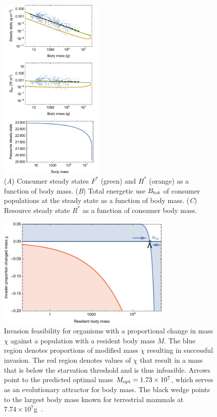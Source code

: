 \documentclass{pnastwo}
\begin{document}
\begin{figure}
\centering
\includegraphics[width=0.45\textwidth]{fig_FPAllometric.pdf}
\caption{ (\emph{A}) Consumer steady states $F^*$ (green) and $H^*$ (orange) as a function of
  body mass.
  (\emph{B}) Total energetic use $B_{\rm tot}$ of consumer populations at the steady state as a function of body mass.
  (\emph{C}) Resource steady state $R^*$ as a function of consumer body mass.}
\label{fig:mass}
\end{figure}

\begin{figure}
\centering
\includegraphics[width=0.75\textwidth]{fig_Invasion.pdf}
\caption{ Invasion feasibility for organisms with a proportional change in
  mass $\chi$ against a population with a resident body mass $M$.  The blue
  region denotes proportions of modified mass $\chi$ resulting in successful invasion.  The
  red region denotes values of $\chi$ that result in a mass that is below the
  starvation threshold and is thus infeasible.
  Arrows point to the predicted optimal mass $M_{\rm opt}=1.73\times 10^7$, which serves as an evolutionary attractor for body mass.
  The black wedge points to the largest body mass known for terrestrial mammals at $7.74\times10^7$g~\cite{Smith:2010p3442}.}
\label{fig:invasion}
\end{figure}
\end{document}

